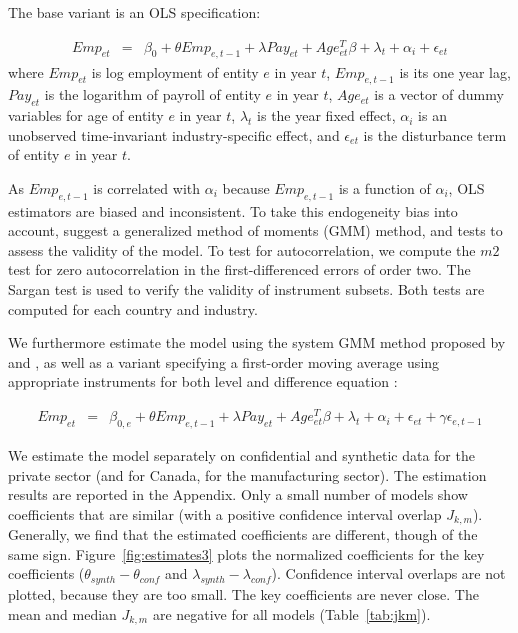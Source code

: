 The base variant is an OLS specification:

\begin{eqnarray}	
\label{eq:OLS}
Emp_{et} & = & \beta_0 + \theta Emp_{e,t-1} + \lambda Pay_{et} + Age_{et}^{T}\beta + \lambda_t + \alpha_i + \epsilon_{et}
\end{eqnarray}
where $Emp_{et}$ is log employment of entity $e$ in year $t$, $Emp_{e,t-1}$ is its one year lag, $Pay_{et}$ is the logarithm of payroll of entity $e$ in year $t$, $Age_{et}$ is a vector of dummy variables for age of entity $e$ in year $t$, $\lambda_t$ is the year fixed effect, $\alpha_i$ is an unobserved time-invariant industry-specific effect, and $\epsilon_{et}$ is the disturbance term of entity $e$ in year $t$. 


As $Emp_{e,t-1}$ is correlated with $\alpha_{i}$ because $Emp_{e,t-1}$ is a function of $\alpha_{i}$, 
OLS estimators are biased and inconsistent. 
To take this endogeneity bias into account,  \textcite{RePEc:oup:restud:v:58:y:1991:i:2:p:277-297.} suggest a generalized method of moments (GMM) method, and tests to assess the  validity of the model.  To test for autocorrelation, we compute the  $m2$ test  for zero autocorrelation in the  first-differenced errors of order two. The Sargan test is used to verify the validity of instrument subsets. Both tests are computed for each country and industry.

We furthermore estimate the model using the system GMM  method proposed by \textcite{RePEc:eee:econom:v:68:y:1995:i:1:p:29-51} and \textcite{RePEc:eee:econom:v:87:y:1998:i:1:p:115-143}, as well as a variant specifying a first-order moving average using appropriate instruments for both level and difference equation  \parencite{RePEc:eee:econom:v:68:y:1995:i:1:p:29-51,RePEc:eee:econom:v:87:y:1998:i:1:p:115-143}:

\begin{eqnarray}	
Emp_{et}&=&\beta_{0,e} +\theta Emp_{e,t-1}+\lambda Pay_{et}+Age_{et}^{T}\beta+\lambda_t+\alpha_i+\epsilon_{et}+\gamma\epsilon_{e,t-1}
\end{eqnarray}


We estimate the model separately on confidential and synthetic data for the private sector (and for Canada, for the manufacturing sector). The estimation results are reported in the Appendix. Only a small number of models show coefficients that are similar (with a positive confidence interval overlap $J_{k,m}$). Generally, we find that the estimated coefficients are different, though of the same sign.  Figure~\ref{fig:estimates3} plots the normalized coefficients for the key coefficients ($\theta_{synth}-\theta_{conf}$ and $\lambda_{synth}-\lambda_{conf}$). Confidence interval overlaps are not plotted, because they are too small.  The key coefficients  are never close. The mean and median $J_{k,m}$ are negative for all models (Table~\ref{tab:jkm}).


